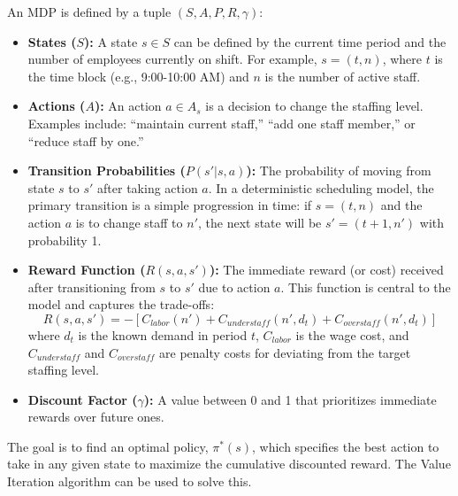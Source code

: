 \documentclass{article}
\begin{document}
An MDP is defined by a tuple $(S, A, P, R, \gamma)$:
\begin{itemize}
    \item \textbf{States ($S$):} A state $s \in S$ can be defined by the current time period and the number of employees currently on shift. For example, $s = (t, n)$, where $t$ is the time block (e.g., 9:00-10:00 AM) and $n$ is the number of active staff.
    \item \textbf{Actions ($A$):} An action $a \in A_s$ is a decision to change the staffing level. Examples include: ``maintain current staff,'' ``add one staff member,'' or ``reduce staff by one.''
    \item \textbf{Transition Probabilities ($P(s'|s, a)$):} The probability of moving from state $s$ to $s'$ after taking action $a$. In a deterministic scheduling model, the primary transition is a simple progression in time: if $s = (t, n)$ and the action $a$ is to change staff to $n'$, the next state will be $s' = (t+1, n')$ with probability 1.
    \item \textbf{Reward Function ($R(s, a, s')$):} The immediate reward (or cost) received after transitioning from $s$ to $s'$ due to action $a$. This function is central to the model and captures the trade-offs:
    \begin{equation}
        R(s, a, s') = - [C_{labor}(n') + C_{understaff}(n', d_t) + C_{overstaff}(n', d_t)]
    \end{equation}
    where $d_t$ is the known demand in period $t$, $C_{labor}$ is the wage cost, and $C_{understaff}$ and $C_{overstaff}$ are penalty costs for deviating from the target staffing level.
    \item \textbf{Discount Factor ($\gamma$):} A value between 0 and 1 that prioritizes immediate rewards over future ones.
\end{itemize}
The goal is to find an optimal policy, $\pi^*(s)$, which specifies the best action to take in any given state to maximize the cumulative discounted reward. The Value Iteration algorithm can be used to solve this.
\end{document}
